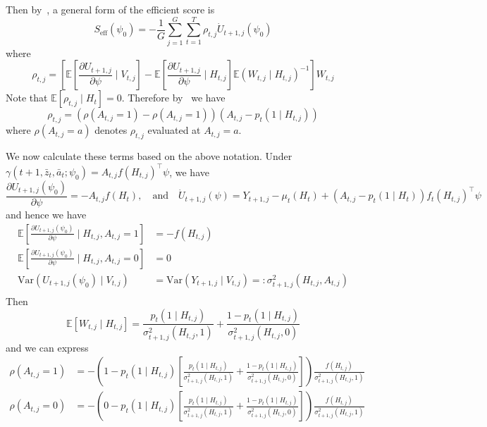 \documentclass[supplementary, lineno]{biometrika}
\begin{document}
Then by~\cite[Lemma I.8]{Qian2021}, a general form of the efficient score is
$$
S_{\text{eff}} (\psi_0) = - \frac{1}{G} \sum_{j=1}^G \sum_{t=1}^T \rho_{t,j} \dot{U}_{t+1,j} (\psi_0)
$$
where
$$
\rho_{t,j} = \left[ \mathbb{E} \left[ \frac{\partial U_{t+1,j}}{\partial \psi} \mid V_{t,j} \right] - \mathbb{E} \left[ \frac{\partial U_{t+1,j}}{\partial \psi} \mid H_{t,j} \right] \mathbb{E} \left( W_{t,j} \mid H_{t,j} \right)^{-1} \right] W_{t,j}
$$
Note that $\mathbb{E} \left[ \rho_{t,j} \mid H_t \right] = 0$.  Therefore by~\cite[Lemma I.1]{Qian2021} we have
$$
\rho_{t,j} = \left( \rho(A_{t,j} = 1) - \rho(A_{t,j} = 1) \right) (A_{t,j} - p_t (1 \mid H_{t,j}))
$$
where  $\rho(A_{t,j} = a)$ denotes $\rho_{t,j}$ evaluated at $A_{t,j} = a$.

We now calculate these terms based on the above notation. Under $\gamma(t+1, \bar z_t, \bar a_t; \psi_0) = A_{t,j} f(H_{t,j})^\top \psi$, we have
$$
\frac{\partial U_{t+1,j} (\psi_0)}{\partial \psi} = - A_{t,j} f(H_t), \quad \text{and} \quad
\dot{U}_{t+1,j} (\psi) = Y_{t+1,j} - \mu_t (H_t) + (A_{t,j}-p_t(1 \mid H_t)) f_t(H_{t,j})^\top \psi
$$
and hence we have
\begin{align*}
\mathbb{E} \left[ \frac{\partial U_{t+1,j} (\psi_0)}{\partial \psi} \mid H_{t,j}, A_{t,j} = 1 \right] &= - f(H_{t,j}) \\
\mathbb{E} \left[ \frac{\partial U_{t+1,j} (\psi_0)}{\partial \psi} \mid H_{t,j}, A_{t,j} = 0 \right] &= 0 \\
\text{Var} \left( U_{t+1,j} (\psi_0) \mid V_{t,j} \right) &=
\text{Var} \left( Y_{t+1,j} \mid V_{t,j} \right) =: \sigma^2_{t+1,j} (H_{t,j}, A_{t,j}) \\
\end{align*}
Then
$$
\mathbb{E} \left[ W_{t,j} \mid H_{t,j} \right] = \frac{p_t (1 \mid H_{t,j} )}{\sigma^2_{t+1,j} (H_{t,j}, 1)} + \frac{1-p_t (1 \mid H_{t,j} )}{\sigma^2_{t+1,j} (H_{t,j}, 0)}
$$
and we can express
\begin{align*}
\rho(A_{t,j} = 1) &= - \left( 1 -p_t ( 1 \mid H_{t,j}) \left[  \frac{p_t (1 \mid H_{t,j} )}{\sigma^2_{t+1,j} (H_{t,j}, 1)} + \frac{1-p_t (1 \mid H_{t,j} )}{\sigma^2_{t+1,j} (H_{t,j}, 0)} \right] \right) \frac{f(H_{t,j})}{\sigma^2_{t+1,j} (H_{t,j}, 1)} \\
\rho(A_{t,j} = 0) &= - \left( 0 -p_t ( 1 \mid H_{t,j}) \left[  \frac{p_t (1 \mid H_{t,j} )}{\sigma^2_{t+1,j} (H_{t,j}, 1)} + \frac{1-p_t (1 \mid H_{t,j} )}{\sigma^2_{t+1,j} (H_{t,j}, 0)} \right] \right) \frac{f(H_{t,j})}{\sigma^2_{t+1,j} (H_{t,j}, 1)}
\end{align*}
\end{document}

